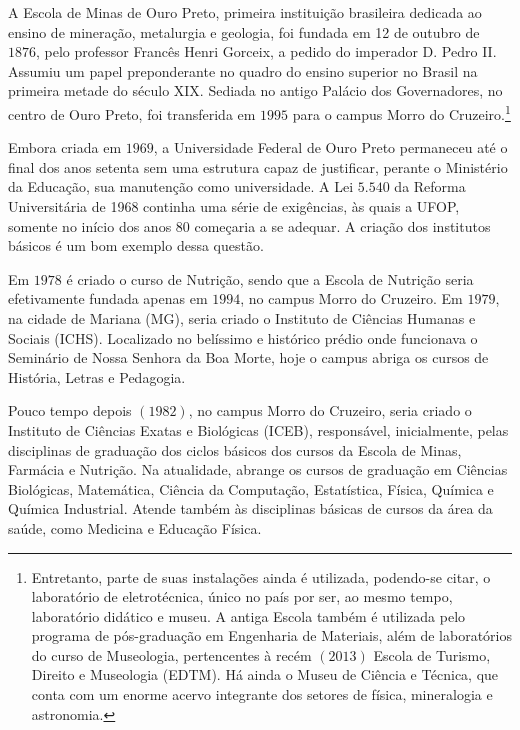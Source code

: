 A Escola de Minas de Ouro Preto, primeira instituição brasileira dedicada ao ensino de mineração, metalurgia e geologia, foi fundada em 12 de outubro de $1876$, pelo professor Francês Henri Gorceix, a pedido do imperador D. Pedro II. Assumiu um papel preponderante no quadro do ensino superior no Brasil na primeira metade do século XIX. Sediada no antigo Palácio dos Governadores, no centro de Ouro Preto, foi transferida em $1995$ para o campus Morro do Cruzeiro.\footnote{Entretanto, parte de suas instalações ainda é utilizada, podendo-se citar, o laboratório de eletrotécnica, único no país por ser, ao mesmo tempo, laboratório didático e museu. A antiga Escola também é utilizada pelo programa de pós-graduação em Engenharia de Materiais, além de laboratórios do curso de Museologia, pertencentes à recém $(2013)$ Escola de Turismo, Direito e Museologia (EDTM). Há ainda o Museu de Ciência e Técnica, que conta com um enorme acervo integrante dos setores de física, mineralogia e astronomia.}

Embora criada em $1969$, a Universidade Federal de Ouro Preto permaneceu até o final dos anos setenta sem uma estrutura capaz de justificar, perante o Ministério da Educação, sua manutenção como universidade. A Lei $5.540$ da Reforma Universitária de 1968 continha uma série de exigências, às quais a UFOP, somente no início dos anos $80$ começaria a se adequar. A criação dos institutos básicos é um bom exemplo dessa questão. 

Em $1978$ é criado o curso de Nutrição, sendo que a Escola de Nutrição seria efetivamente fundada apenas em $1994$, no campus Morro do Cruzeiro. Em $1979$, na cidade de Mariana (MG), seria criado o Instituto de Ciências Humanas e Sociais (ICHS). Localizado no belíssimo e histórico prédio onde funcionava o Seminário de Nossa Senhora da Boa Morte, hoje o campus abriga os cursos de História, Letras e Pedagogia.

Pouco tempo depois $(1982)$, no campus Morro do Cruzeiro, seria criado o Instituto de Ciências Exatas e Biológicas (ICEB), responsável, inicialmente, pelas disciplinas de graduação dos ciclos básicos dos cursos da Escola de Minas, Farmácia e Nutrição. Na atualidade, abrange os cursos de graduação em Ciências Biológicas, Matemática, Ciência da Computação, Estatística, Física, Química e Química Industrial. Atende também às disciplinas básicas de cursos da área da saúde, como Medicina e Educação Física.

